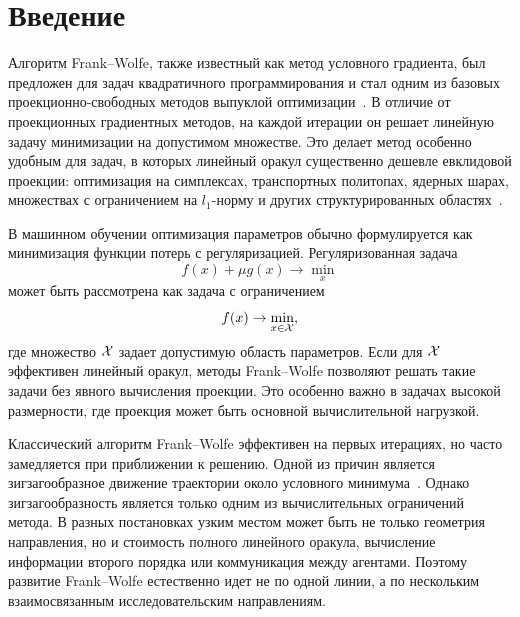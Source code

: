 \newpage

\section{Введение}

Алгоритм Frank--Wolfe, также известный как метод условного градиента, был предложен для задач квадратичного программирования и стал одним из базовых проекционно-свободных методов выпуклой оптимизации~\cite{frank1956algorithm}.
В отличие от проекционных градиентных методов, на каждой итерации он решает линейную задачу минимизации на допустимом множестве.
Это делает метод особенно удобным для задач, в которых линейный оракул существенно дешевле евклидовой проекции: оптимизация на симплексах, транспортных политопах, ядерных шарах, множествах с ограничением на $l_1$-норму и других структурированных областях~\cite{jaggi2013revisiting,braun2022conditional}.

В машинном обучении оптимизация параметров обычно формулируется как минимизация функции потерь с регуляризацией.
Регуляризованная задача
\[
    f(x) + \mu g(x) \to \min_x
\]
может быть рассмотрена как задача с ограничением
\[
    f(x) \to \min_{x \in \mathcal{X}},
\]
где множество $\mathcal{X}$ задает допустимую область параметров.
Если для $\mathcal{X}$ эффективен линейный оракул, методы Frank--Wolfe позволяют решать такие задачи без явного вычисления проекции.
Это особенно важно в задачах высокой размерности, где проекция может быть основной вычислительной нагрузкой.

Классический алгоритм Frank--Wolfe эффективен на первых итерациях, но часто замедляется при приближении к решению.
Одной из причин является зигзагообразное движение траектории около условного минимума~\cite{patriksson2015traffic}.
Однако зигзагообразность является только одним из вычислительных ограничений метода.
В разных постановках узким местом может быть не только геометрия направления, но и стоимость
полного линейного оракула, вычисление информации второго порядка или коммуникация между
агентами.
Поэтому развитие Frank--Wolfe естественно идет не по одной линии, а по нескольким
взаимосвязанным исследовательским направлениям.

